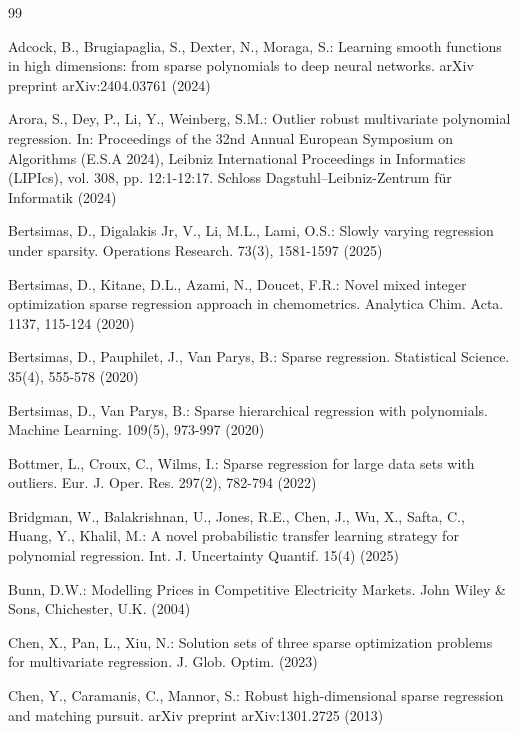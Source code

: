 \documentclass[smallextended,referee,envcountsect,,numbers]{svjour3}
\begin{document}
%
%
\begin{thebibliography}{99}
	
	 Adcock, B., Brugiapaglia, S., Dexter, N., Moraga, S.: Learning smooth functions in high dimensions: from sparse polynomials to deep neural networks. arXiv preprint arXiv:2404.03761 (2024)
	
	 Arora, S., Dey, P., Li, Y., Weinberg, S.M.: Outlier robust multivariate polynomial regression. In: Proceedings of the 32nd Annual European Symposium on Algorithms (E.S.A 2024), Leibniz International Proceedings in Informatics (LIPIcs), vol. 308, pp. 12:1-12:17. Schloss Dagstuhl–Leibniz-Zentrum für Informatik (2024)
	
	 Bertsimas, D., Digalakis Jr, V., Li, M.L., Lami, O.S.: Slowly varying regression under sparsity. Operations Research. 73(3), 1581-1597 (2025)
	
	 Bertsimas, D., Kitane, D.L., Azami, N., Doucet, F.R.: Novel mixed integer optimization sparse regression approach in chemometrics. Analytica Chim. Acta. 1137, 115-124 (2020)
	
	 Bertsimas, D., Pauphilet, J., Van Parys, B.: Sparse regression. Statistical Science. 35(4), 555-578 (2020)
	
	 Bertsimas, D., Van Parys, B.: Sparse hierarchical regression with polynomials. Machine Learning. 109(5), 973-997 (2020)
	
	 Bottmer, L., Croux, C., Wilms, I.: Sparse regression for large data sets with outliers. Eur. J. Oper. Res. 297(2), 782-794 (2022)
	
	 Bridgman, W., Balakrishnan, U., Jones, R.E., Chen, J., Wu, X., Safta, C., Huang, Y., Khalil, M.: A novel probabilistic transfer learning strategy for polynomial regression. Int. J. Uncertainty Quantif. 15(4) (2025)
	
	 Bunn, D.W.: Modelling Prices in Competitive Electricity Markets. John Wiley \& Sons, Chichester, U.K. (2004)
	
	 Chen, X., Pan, L., Xiu, N.: Solution sets of three sparse optimization problems for multivariate regression. J. Glob. Optim.  (2023)
	
	 Chen, Y., Caramanis, C., Mannor, S.: Robust high-dimensional sparse regression and matching pursuit. arXiv preprint arXiv:1301.2725 (2013)
	

\end{thebibliography}
\end{document}
